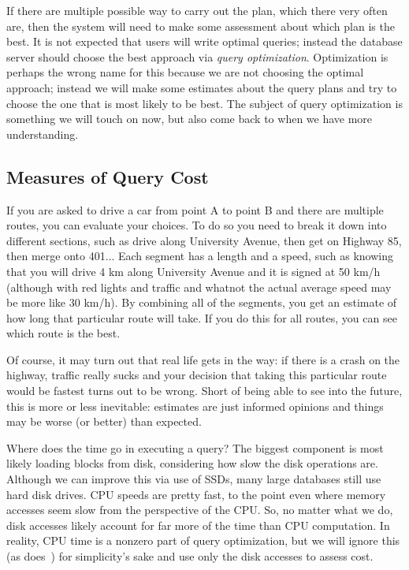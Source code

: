 If there are multiple possible way to carry out the plan, which there very often are, then the system will need to make some assessment about which plan is the best. It is not expected that users will write optimal queries; instead the database server should choose the best approach via \textit{query optimization}. Optimization is perhaps the wrong name for this because we are not choosing the optimal approach; instead we will make some estimates about the query plans and try to choose the one that is most likely to be best. The subject of query optimization is something we will touch on now, but also come back to when we have more understanding.

\subsection*{Measures of Query Cost}

If you are asked to drive a car from point A to point B and there are multiple routes, you can evaluate your choices. To do so you need to break it down into different sections, such as drive along University Avenue, then get on Highway 85, then merge onto 401... Each segment has a length and a speed, such as knowing that you will drive 4 km along University Avenue and it is signed at 50 km/h (although with red lights and traffic and whatnot the actual average speed may be more like 30 km/h). By combining all of the segments, you get an estimate of how long that particular route will take. If you do this for all routes, you can see which route is the best. 

Of course, it may turn out that real life gets in the way: if there is a crash on the highway, traffic really sucks and your decision that taking this particular route would be fastest turns out to be wrong. Short of being able to see into the future, this is more or less inevitable: estimates are just informed opinions and things may be worse (or better) than expected. 

Where does the time go in executing a query? The biggest component is most likely loading blocks from disk, considering how slow the disk operations are. Although we can improve this via use of SSDs, many large databases still use hard disk drives. CPU speeds are pretty fast, to the point even where memory accesses seem slow from the perspective of the CPU. So, no matter what we do, disk accesses likely account for far more of the time than CPU computation. In reality, CPU time is a nonzero part of query optimization, but we will ignore this (as does~\cite{dsc}) for simplicity's sake and use only the disk accesses to assess cost.

